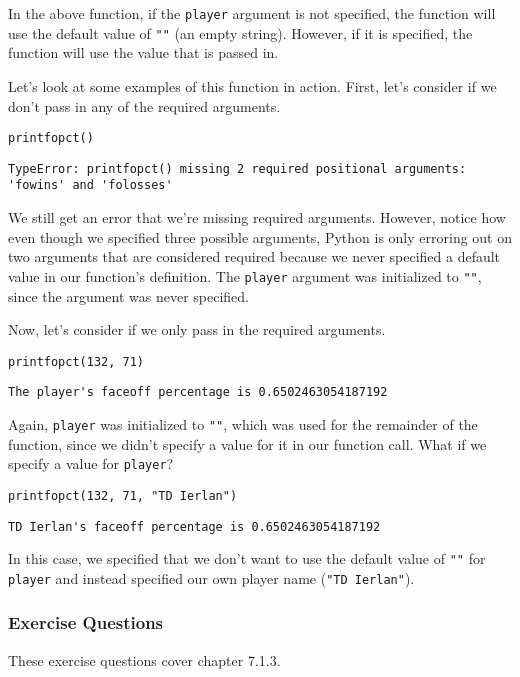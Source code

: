 In the above function, if the \verb|player| argument is not specified, the function will use the default value of \verb|""| (an empty string). However, if it is specified, the function will use the value that is passed in.\par
Let's look at some examples of this function in action. First, let's consider if we don't pass in any of the required arguments.\par
\begin{lstlisting}[style=pippython]
printfopct()
\end{lstlisting}
\begin{lstlisting}[style=pippython]
TypeError: printfopct() missing 2 required positional arguments: 'fowins' and 'folosses'
\end{lstlisting}
We still get an error that we're missing required arguments. However, notice how even though we specified three possible arguments, Python is only erroring out on two arguments that are considered required because we never specified a default value in our function's definition. The \verb|player| argument was initialized to \verb|""|, since the argument was never specified.\par
Now, let's consider if we only pass in the required arguments.\par
\begin{lstlisting}[style=pippython]
printfopct(132, 71)
\end{lstlisting}
\begin{lstlisting}[style=none]
The player's faceoff percentage is 0.6502463054187192
\end{lstlisting}
Again, \verb|player| was initialized to \verb|""|, which was used for the remainder of the function, since we didn't specify a value for it in our function call. What if we specify a value for \verb|player|?\par
\begin{lstlisting}[style=pippython]
printfopct(132, 71, "TD Ierlan")
\end{lstlisting}
\begin{lstlisting}[style=none]
TD Ierlan's faceoff percentage is 0.6502463054187192
\end{lstlisting}
In this case, we specified that we don't want to use the default value of \verb|""| for \verb|player| and instead specified our own player name (\verb|"TD Ierlan"|).
\subsubsection*{Exercise Questions}
These exercise questions cover chapter 7.1.3.

